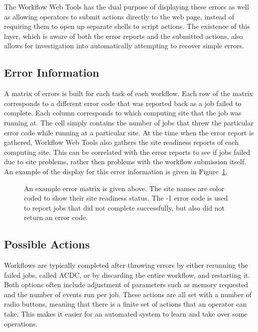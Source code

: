 The Workflow Web Tools has the dual purpose of displaying these errors
as well as allowing operators to submit actions directly to the web page,
instead of requiring them to open up separate shells to script actions.
The existence of this layer,
which is aware of both the error reports and the submitted actions,
also allows for investigation into automatically attempting to recover simple errors.

\subsection{Error Information}

A matrix of errors is built for each task of each workflow.
Each row of the matrix corresponds to a different error code that was reported
back as a job failed to complete.
Each column corresponds to which computing site that the job was running at.
The cell simply contains the number of jobs that threw the particular error code while
running at a particular site.
At the time when the error report is gathered, Workflow Web Tools also gathers
the site readiness reports of each computing site.
This can be correlated with the error reports to see if jobs failed due to site problems,
rather then problems with the workflow submission itself.
An example of the display for this error information is given in Figure~\ref{fig:errormatrix}.
\begin{figure}
  \centering
{}
  \caption[Example error information]{
    An example error matrix is given above.
    The site names are color coded to show their site readiness status.
    The -1 error code is used to report jobs that did not complete successfully,
    but also did not return an error code.
  }
  \label{fig:errormatrix}
\end{figure}

\subsection{Possible Actions}

Workflows are typically completed after throwing errors by either
rerunning the failed jobs, called ACDC,
or by discarding the entire workflow, and restarting it.
Both options often include adjustment of parameters such as memory requested
and the number of events run per job.
These actions are all set with a number of radio buttons,
meaning that there is a finite set of actions that an operator can take.
This makes it easier for an automated system to learn and take over some operations.

